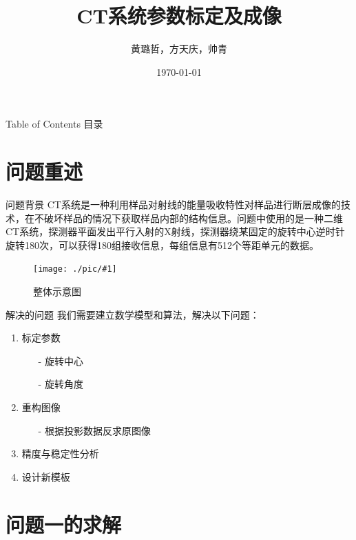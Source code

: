 \documentclass[serif]{beamer} %
\newcommand{\midpic}[2]{  \begin{figure}[H]
\centering
\texttt{[image: ./pic/\#1]}\\
\caption{#2}
\end{figure}}
\begin{document}
 

\title{CT系统参数标定及成像}
\author{黄璐哲，方天庆，帅青}
\date{\today}

\begin{frame}[plain,t]
	\titlepage
\end{frame} 

\begin{frame}{Table of Contents 目录}
	\tableofcontents
\end{frame} 

\section{问题重述}
\begin{frame}{问题背景}
	\small CT系统是一种利用样品对射线的能量吸收特性对样品进行断层成像的技术，在不破坏样品的情况下获取样品内部的结构信息。问题中使用的是一种二维CT系统，探测器平面发出平行入射的X射线，探测器绕某固定的旋转中心逆时针旋转180次，可以获得180组接收信息，每组信息有512个等距单元的数据。
	\midpic{Overall_Sketch.png}{整体示意图}
\end{frame} %


\begin{frame}{解决的问题}
	我们需要建立数学模型和算法，解决以下问题：
	\begin{enumerate}		  
		\item 标定参数
			\begin{enumerate}
				\item[-] 旋转中心
				\item[-] 旋转角度
			\end{enumerate}
		\item 重构图像
			\begin{enumerate}
				\item[-] 根据投影数据反求原图像
			\end{enumerate}
		\item 精度与稳定性分析
		\item 设计新模板
	\end{enumerate}
\end{frame} %



\section{问题一的求解}
\end{document}
